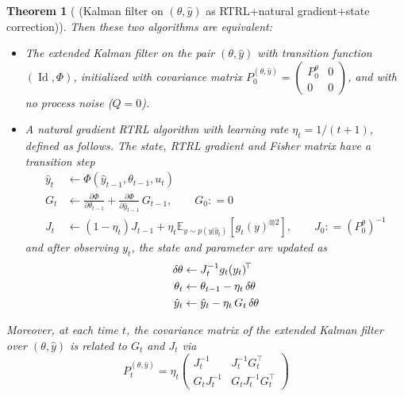 \documentclass[11pt,a4paper]{article}
\newcommand{\deq}{\mathrel{\mathop{:}}=}
\newcommand{\eqd}{=\mathrel{\mathop{:}}}
\newcommand{\E}{\mathbb{E}}
\DeclareMathOperator{\Id}{Id}
\newcommand{\1}{\mathbbm{1}}
\theoremstyle{yannthm}
\newtheorem{thm}[defi]{Theorem}
\theoremstyle{yannthm2}
\newcommand{\transp}[1]{#1^{\!\top}\!}
\newcommand{\Ptheta}{P^\theta}
\newcommand{\Py}{P^{\hat y}}
\newcommand{\Pthetay}{P^{\theta\hat y}}
\newcommand{\deltatheta}{\delta\hspace{-.05em}\theta}
\newcommand{\transf}{\Phi}
\numberwithin{equation}{section}
\begin{document}
\begin{thm}[ (Kalman filter on $(\theta,\hat y)$ as RTRL+natural
gradient+state correction)]
Then these two algorithms are equivalent:
\begin{itemize}
\item The
extended Kalman filter on the pair $(\theta,\hat
y)$ with transition function $(\Id,\transf)$, initialized with covariance matrix $P_0^{(\theta,\hat y)}=\begin{pmatrix} \Ptheta_0 &
0 \\ 0 &0 \end{pmatrix}$, and with no process noise ($Q=0$). 
\item A natural gradient RTRL algorithm with learning rate
$\eta_t=1/(t+1)$, defined as follows.
The state, RTRL gradient and Fisher matrix have a transition step
\begin{align}
\hat y_t &\gets\transf(\hat y_{t-1},\theta_{t-1},u_t)
\\
G_t &\gets \frac{\partial
\transf}{\partial \theta_{t-1}}+\frac{\partial \transf}{\partial \hat
y_{t-1}}\,G_{t-1},
\qquad G_0\deq 0
\\
J_t &\gets (1-\eta_t) J_{t-1} + \eta_t \E_{y\sim p(y|\hat y_t)}
\left[g_t(y)^{\otimes 2}\right],
\qquad J_0\deq (\Ptheta_0)^{-1} \label{eq:recJupdate}
\end{align}
and after observing $y_t$,
the state and
parameter are updated as
\begin{align}
\deltatheta &\gets J_t^{-1}\transp{g_t(y_t)}
\\\theta_t &\gets \theta_{t-1}-\eta_t \,\deltatheta
\\\hat y_t &\gets \hat y_t-\eta_t \, G_t \,\deltatheta
\label{eq:jointstateupdate}
\end{align}
\end{itemize}
Moreover, at each time $t$, the covariance matrix of the
extended Kalman filter over $(\theta,\hat y)$ is related to $G_t$ and
$J_t$ via
\begin{equation}
\label{eq:kalmancov}
P_t^{(\theta,\hat y)}=\eta_t
\begin{pmatrix}
J_t^{-1} & J_t^{-1} \transp{G_t}
\\ G_t J_t^{-1} & G_t J_t^{-1} \transp{G_t}
\end{pmatrix}
\end{equation}
\end{thm}
\end{document}

